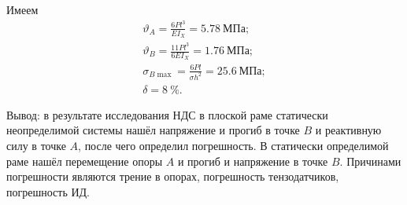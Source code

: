 Имеем
\begin{align*}
    \vartheta_A = \frac{6 P l^3}{E I_X} = 5.78~МПа; \\
    \vartheta_B = \frac{11 P l^3}{6 E I_X} = 1.76~МПа; \\
    \sigma_{B \max} = \frac{6 P l}{\sigma h^2} = 25.6~МПа; \\
    \delta = 8~\%.
\end{align*}

Вывод: в результате исследования НДС в плоской раме статически неопределимой системы нашёл напряжение и прогиб в точке $B$ и реактивную силу в точке $A$, после чего определил погрешность.
В статически определимой раме нашёл перемещение опоры $A$ и прогиб и напряжение в точке $B$.
Причинами погрешности являются трение в опорах, погрешность тензодатчиков, погрешность ИД.
